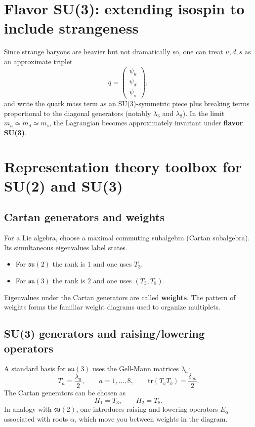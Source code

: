 \section{Flavor SU(3): extending isospin to include strangeness}
Since strange baryons are heavier but not dramatically so, one can treat $u,d,s$ as an approximate triplet
\[
q=\begin{pmatrix}\psi_u\\ \psi_d\\ \psi_s\end{pmatrix},
\]
and write the quark mass term as an SU(3)-symmetric piece plus breaking terms proportional to the diagonal generators (notably $\lambda_3$ and $\lambda_8$). In the limit $m_u\simeq m_d\simeq m_s$, the Lagrangian becomes approximately invariant under \textbf{flavor SU(3)}.

\section{Representation theory toolbox for SU(2) and SU(3)}
\subsection{Cartan generators and weights}
For a Lie algebra, choose a maximal commuting subalgebra (Cartan subalgebra). Its simultaneous eigenvalues label states.
\begin{itemize}
  \item For $\mathfrak{su}(2)$ the rank is $1$ and one uses $T_3$.
  \item For $\mathfrak{su}(3)$ the rank is $2$ and one uses $(T_3,T_8)$.
\end{itemize}
Eigenvalues under the Cartan generators are called \textbf{weights}. The pattern of weights forms the familiar weight diagrams used to organize multiplets.

\subsection{SU(3) generators and raising/lowering operators}
A standard basis for $\mathfrak{su}(3)$ uses the Gell-Mann matrices $\lambda_a$:
\[
T_a=\frac{\lambda_a}{2},\qquad a=1,\dots,8,
\qquad
\mathrm{tr}(T_aT_b)=\frac{\delta_{ab}}{2}.
\]
The Cartan generators can be chosen as
\[
H_1=T_3,\qquad H_2=T_8.
\]
In analogy with $\mathfrak{su}(2)$, one introduces raising and lowering operators $E_\alpha$ associated with roots $\alpha$, which move you between weights in the diagram.

